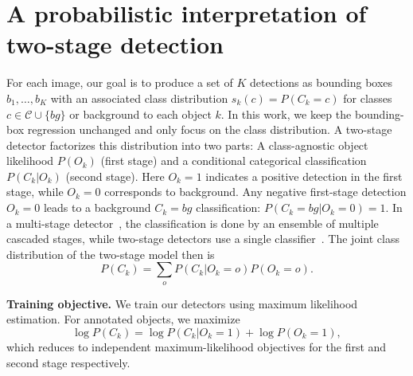 \documentclass{article}
\renewcommand{\paragraph}[1]{\noindent\textbf{#1}}
\newcommand{\lbleq}[1]{\label{eq:#1}}
\begin{document}
\section{A probabilistic interpretation of two-stage detection}
For each image, our goal is to produce a set of $K$ detections as bounding boxes $b_1, \ldots, b_K$ with an associated class distribution $s_k(c) = P(C_k=c)$ for classes $c \in \mathcal{C} \cup \{bg\}$ or background to each object $k$.
In this work, we keep the bounding-box regression unchanged and only focus on the class distribution.
A two-stage detector factorizes this distribution into two parts: A class-agnostic object likelihood $P(O_k)$ (first stage) and a conditional categorical classification $P(C_k| O_k)$ (second stage).
Here $O_k=1$ indicates a positive detection in the first stage, while $O_k=0$ corresponds to background.
Any negative first-stage detection $O_k=0$ leads to a background $C_k=bg$ classification: $P(C_k=bg | O_k=0)=1$.
In a multi-stage detector~\cite{cai2018cascade}, the classification is done by an ensemble of multiple cascaded stages, while two-stage detectors use a single classifier~\cite{ren2015faster}.
The joint class distribution of the two-stage model then is
\begin{equation}
P(C_k) = \sum_o P(C_k|O_k=o)P(O_k=o)\lbleq{prob_det}.
\end{equation}

\paragraph{Training objective.} We train our detectors using maximum likelihood estimation.
For annotated objects, we maximize
\begin{equation}
 \log P(C_k) = \log P(C_k|O_k\!=\!1) + \log P(O_k\!=\!1)\lbleq{ll_pos},
\end{equation}
which reduces to independent maximum-likelihood objectives for the first and second stage respectively.
\end{document}
